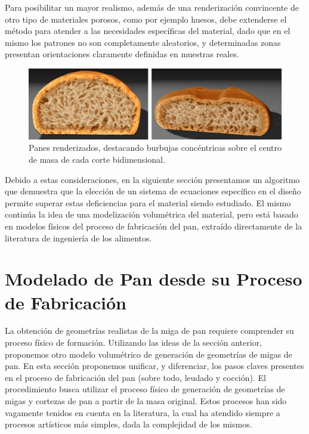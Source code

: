 Para posibilitar un mayor realismo, además de una renderización convincente de otro tipo de materiales porosos, como por ejemplo huesos, debe extenderse el método para atender a las necesidades específicas del material, dado que en el mismo los patrones no son completamente aleatorios, y determinadas zonas presentan orientaciones claramente definidas en muestras reales.

\begin{figure}
  \centerline{\includegraphics[width=12cm]{figures/Fig11CAVW}}
  \caption[Panes renderizados con burbujas concéntricas]{Panes renderizados, destacando burbujas concéntricas sobre el centro de masa de cada corte bidimensional.}
  \label{fg:Fig11}
\end{figure}


Debido a estas consideraciones, en la siguiente sección presentamos un algoritmo que demuestra que la elección de un sistema de ecuaciones específico en el diseño permite superar estas deficiencias para el material siendo estudiado.
El mismo continúa la idea de una modelización volumétrica del material, pero está basado en modelos físicos del proceso de fabricación del pan, extraído directamente de la literatura de ingeniería de los alimentos.

\section{Modelado de Pan desde su Proceso de Fabricación}
La obtención de geometrías realistas de la miga de pan requiere comprender su proceso físico de formación.
Utilizando las ideas de la sección anterior, proponemos otro modelo volumétrico de generación de geometrías de migas de pan.
En esta sección proponemos unificar, y diferenciar, los pasos claves presentes en el proceso de fabricación del pan (sobre todo, leudado y cocción).
El procedimiento busca utilizar el proceso físico de generación de geometrías de migas y cortezas de pan a partir de la masa original.
Estos procesos han sido vagamente tenidos en cuenta en la literatura, la cual ha atendido siempre a procesos artísticos más simples, dada la complejidad de los mismos.


